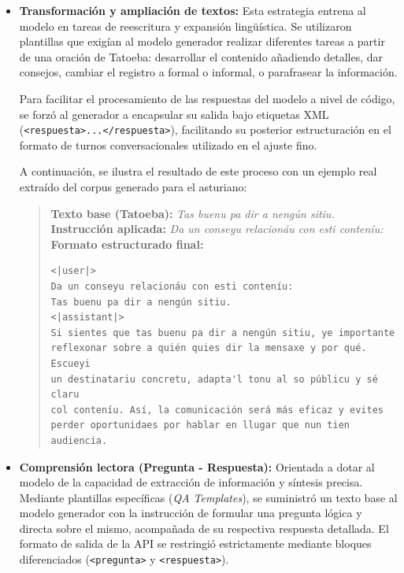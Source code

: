 \begin{itemize}
    \item \textbf{Transformación y ampliación de textos:} Esta estrategia entrena al modelo en tareas de reescritura y expansión lingüística. Se utilizaron plantillas que exigían al modelo generador realizar diferentes tareas a partir de una oración de Tatoeba: desarrollar el contenido añadiendo detalles, dar consejos, cambiar el registro a formal o informal, o parafrasear la información. 
    
    Para facilitar el procesamiento de las respuestas del modelo a nivel de código, se forzó al generador a encapsular su salida bajo etiquetas XML (\texttt{<respuesta>...</respuesta>}), facilitando su posterior estructuración en el formato de turnos conversacionales utilizado en el ajuste fino.
    
    A continuación, se ilustra el resultado de este proceso con un ejemplo real extraído del corpus generado para el asturiano:
    
    \begin{quotation}
        \noindent\textbf{Texto base (Tatoeba):} \textit{Tas buenu pa dir a nengún sitiu.}\\
        \textbf{Instrucción aplicada:} \textit{Da un conseyu relacionáu con esti conteníu:}\\
        
        \noindent\textbf{Formato estructurado final:}
       \begin{verbatim}
<​|user|>
Da un conseyu relacionáu con esti conteníu:
Tas buenu pa dir a nengún sitiu.
<​|assistant|>
Si sientes que tas buenu pa dir a nengún sitiu, ye importante 
reflexonar sobre a quién quies dir la mensaxe y por qué. Escueyi 
un destinatariu concretu, adapta'l tonu al so públicu y sé claru 
col conteníu. Así, la comunicación será más eficaz y evites 
perder oportunidaes por hablar en llugar que nun tien audiencia.
\end{verbatim}
    \end{quotation}

    \item \textbf{Comprensión lectora (Pregunta - Respuesta):} Orientada a dotar al modelo de la capacidad de extracción de información y síntesis precisa. Mediante plantillas específicas (\textit{QA Templates}), se suministró un texto base al modelo generador con la instrucción de formular una pregunta lógica y directa sobre el mismo, acompañada de su respectiva respuesta detallada. El formato de salida de la API se restringió estrictamente mediante bloques diferenciados (\texttt{<pregunta>} y \texttt{<respuesta>}).
    

\end{itemize}
